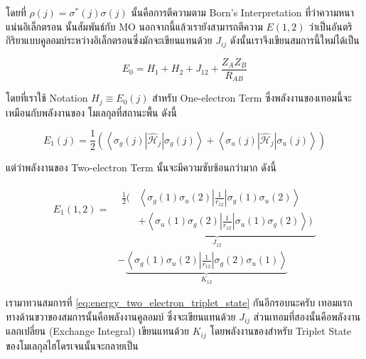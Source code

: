 \noindent โดยที่ $\rho(j) = \sigma^*(j) \sigma(j)$ นั้นคือการตีความตาม Born's Interpretation ที่ว่าความหนาแน่นอิเล็กตรอน%
นั้นสัมพันธ์กับ MO นอกจากนี้แล้วเรายังสามารถตีความ $E(1,2)$ ว่าเป็นอันตริกิริยาแบบคูลอมบ์ระหว่างอิเล็กตรอนซึ่งมักจะเขียนแทนด้วย $J_{i j}$
ดังนั้นเราจึงเขียนสมการนี้ใหม่ได้เป็น

\begin{equation}
    E_0
    =
    H_1 + H_2 + J_{12} + \frac{Z_A Z_B}{R_{A B}}
\end{equation}

\noindent โดยที่เราใช้ Notation $H_j \equiv E_0(j)$ สำหรับ One-electron Term ซึ่งพลังงานของเทอมนี้จะเหมือนกับพลังงานของ%
โมเลกุลที่สถานะพื้น ดังนี้

\begin{equation}
    \label{eq:energy_one_electron_triplet_state}
    E_1(j)
    =
    \frac{1}{2}
    \left(
    \left\langle
    \sigma_g(j)\left|\hat{\mathscr{H}}_j\right| \sigma_g(j)
    \right\rangle
    +
    \left\langle
    \sigma_u(j)\left|\hat{\mathscr{H}}_j\right| \sigma_u(j)
    \right\rangle
    \right)
\end{equation}

\noindent แต่ว่าพลังงานของ Two-electron Term นั้นจะมีความซับซ้อนกว่ามาก ดังนี้

\begin{equation}
    \label{eq:energy_two_electron_triplet_state}
    \begin{aligned}
        E_1(1,2)
        = &
        \underbrace{
            \begin{aligned}
                \frac{1}{2}
                \biggl(
                 & \left\langle\sigma_g(1) \sigma_u(2)
                \left|\frac{1}{r_{12}}\right|
                \sigma_g(1) \sigma_u(2)\right\rangle     \\
                 & + \left\langle\sigma_u(1) \sigma_g(2)
                \left|\frac{1}{r_{12}}\right|
                \sigma_u(1) \sigma_g(2)\right\rangle
                \biggl)
            \end{aligned}
        }_{J_{12}}        \\
          & -\underbrace{
            \left\langle\sigma_g(1) \sigma_u(2)
            \left|\frac{1}{r_{12}}\right|
            \sigma_g(2) \sigma_u(1)\right\rangle}
        _{K_{12}}
    \end{aligned}
\end{equation}

เรามาทวนสมการที่ \eqref{eq:energy_two_electron_triplet_state} กันอีกรอบนะครับ เทอมแรกทางด้านขวาของสมการนั้นคือพลังงานคูลอมบ์%
ซึ่งจะเขียนแทนด้วย $J_{i j}$ ส่วนเทอมที่สองนั้นคือพลังงานแลกเปลี่ยน (Exchange Integral) เขียนแทนด้วย $K_{i j}$ โดยพลังงานของสำหรับ
Triplet State ของโมเลกุลไฮโดรเจนนั้นจะกลายเป็น

